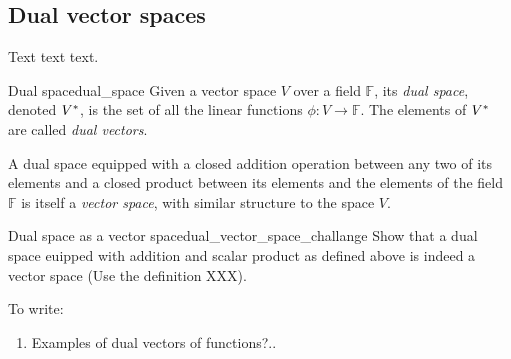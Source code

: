 \subsection{Dual vector spaces}

Text text text.

\begin{definition}{Dual space}{dual_space}
    Given a vector space $V$ over a field $\mathbb{F}$, its \textit{dual space}, denoted $V^{*}$, is the set of all the linear functions $\phi:V\to\mathbb{F}$. The elements of $V^{*}$ are called \textit{dual vectors}.
\end{definition}

A dual space equipped with a closed addition operation between any two of its elements and a closed product between its elements and the elements of the field $\mathbb{F}$ is itself a \textit{vector space}, with similar structure to the space $V$.

\begin{challenge}{Dual space as a vector space}{dual_vector_space_challange}
    Show that a dual space euipped with addition and scalar product as defined above is indeed a vector space (Use the definition XXX).
\end{challenge}

To write:
\begin{enumerate}
    \item Examples of dual vectors of functions?..
\end{enumerate}

